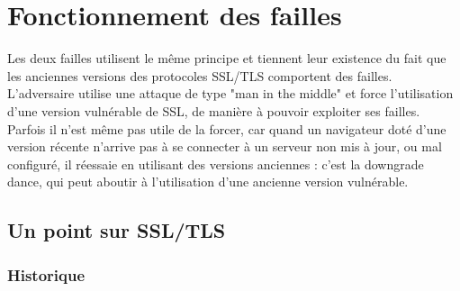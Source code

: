 \section{Fonctionnement des failles}


Les deux failles utilisent le m\^eme principe et tiennent leur existence du fait que les anciennes versions des protocoles SSL/TLS comportent des failles. L'adversaire utilise une attaque de type "man in the middle" et force l'utilisation d'une version vulnérable de SSL, de manière à pouvoir exploiter ses failles. Parfois il n'est m\^eme pas utile de la forcer, car quand un navigateur doté d’une version récente n’arrive pas à se connecter à un serveur non mis à jour, ou mal configuré, il réessaie en utilisant des versions anciennes : c’est la downgrade dance, qui peut aboutir à l'utilisation d'une ancienne version vulnérable.

\subsection{Un point sur SSL/TLS}

\subsubsection{Historique}

